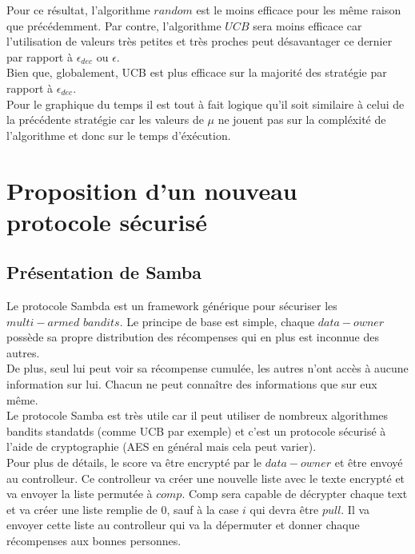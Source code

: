 \documentclass[a4paper, 12pt]{article}
\begin{document}
Pour ce résultat, l'algorithme $\textit{random}$ est le moins efficace pour les même raison que précédemment. Par contre, l'algorithme $\textit{UCB}$ sera moins efficace car l'utilisation de valeurs très petites et très proches peut désavantager ce dernier par rapport à $\epsilon_{dec}$ ou $\epsilon$.
\\Bien que, globalement, UCB est plus efficace sur la majorité des stratégie par rapport à $\epsilon_{dec}$.
\\Pour le graphique du temps il est tout à fait logique qu'il soit similaire à celui de la précédente stratégie car les valeurs de $\mu$ ne jouent pas sur la compléxité de l'algorithme et donc sur le temps d'éxécution.
\section{Proposition d'un nouveau protocole sécurisé}
\subsection{Présentation de Samba}
Le protocole Sambda est un framework générique pour sécuriser les $multi-armed$ $bandits$. Le principe de base est simple, chaque $data-owner$ possède sa propre distribution des récompenses qui en plus est inconnue des autres.
\\De plus, seul lui peut voir sa récompense cumulée, les autres n'ont accès à aucune information sur lui. Chacun ne peut connaître des informations que sur eux même.
\\Le protocole Samba est très utile car il peut utiliser de nombreux algorithmes bandits standatds (comme UCB par exemple) et c'est un protocole sécurisé à l'aide de cryptographie (AES en général mais cela peut varier). 
\\Pour plus de détails, le score va être encrypté par le $data-owner$ et être envoyé au controlleur. Ce controlleur va créer une nouvelle liste avec le texte encrypté et va envoyer la liste permutée à $comp$. 
Comp sera capable de décrypter chaque text et va créer une liste remplie de 0, sauf à la case $i$ qui devra être $pull$. Il va envoyer cette liste au controlleur qui va la dépermuter et donner chaque récompenses aux bonnes personnes.
\end{document}
